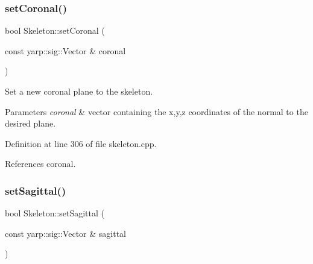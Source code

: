 \subsubsection{\texorpdfstring{setCoronal()}{setCoronal()}}
{\footnotesize\ttfamily bool Skeleton\+::set\+Coronal (\begin{DoxyParamCaption}\item[{const yarp\+::sig\+::\+Vector \&}]{coronal }\end{DoxyParamCaption})}



Set a new coronal plane to the skeleton. 


\begin{DoxyParams}{Parameters}
{\em coronal} & vector containing the x,y,z coordinates of the normal to the desired plane. \\
\hline
\end{DoxyParams}


Definition at line 306 of file skeleton.\+cpp.


\begin{DoxyCode}{0}

\end{DoxyCode}


References coronal.

\mbox{\label{classassistive__rehab_1_1Skeleton_af92fdb0e3eb88a0b1dedd5038e2c6eb7}} 
\subsubsection{\texorpdfstring{setSagittal()}{setSagittal()}}
{\footnotesize\ttfamily bool Skeleton\+::set\+Sagittal (\begin{DoxyParamCaption}\item[{const yarp\+::sig\+::\+Vector \&}]{sagittal }\end{DoxyParamCaption})}



